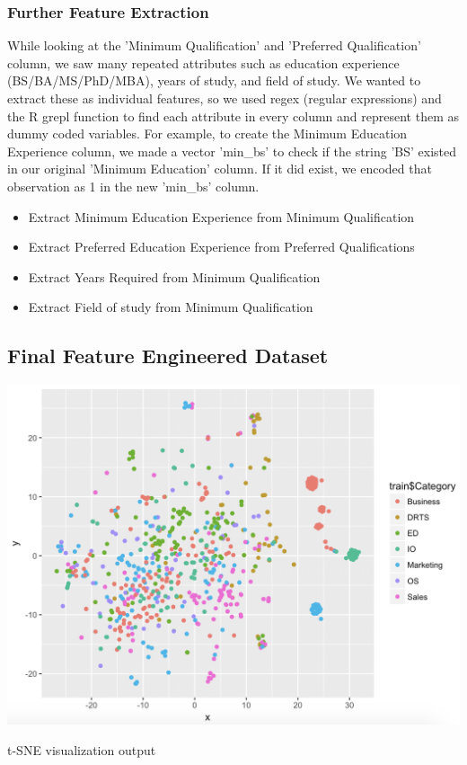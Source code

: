 \documentclass[9.5 pt]{article}
\begin{document}
\subsubsection{Further Feature Extraction}
While looking at the 'Minimum Qualification' and 'Preferred Qualification' column, we saw many repeated attributes such as education experience (BS/BA/MS/PhD/MBA), years of study, and field of study. We wanted to extract these as individual features, so we used regex (regular expressions) and the R grepl function to find each attribute in every column and represent them as dummy coded variables. For example, to create the Minimum Education Experience column, we made a vector 'min\_bs' to check if the string 'BS' existed in our original 'Minimum Education' column. If it did exist, we encoded that observation as 1 in the new 'min\_bs' column.
\begin{itemize}
    \item Extract Minimum Education Experience from Minimum Qualification
    \item Extract Preferred Education Experience from Preferred Qualifications
    \item Extract Years Required from Minimum Qualification
    \item Extract Field of study from Minimum Qualification
\end{itemize}

\subsection{Final Feature Engineered Dataset}
\begin{center}
   \includegraphics[width=1\textwidth]{tsne1.png}
 \end{center}
\caption{t-SNE visualization output}
\end{document}
